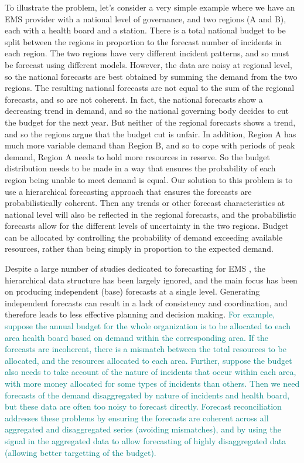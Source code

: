 \documentclass[
  authoryear,
  preprint,
  3p]{elsarticle}
\begin{document}
To illustrate the problem, let's consider a very simple example where we
have an EMS provider with a national level of governance, and two
regions (A and B), each with a health board and a station. There is a
total national budget to be split between the regions in proportion to
the forecast number of incidents in each region. The two regions have
very different incident patterns, and so must be forecast using
different models. However, the data are noisy at regional level, so the
national forecasts are best obtained by summing the demand from the two
regions. The resulting national forecasts are not equal to the sum of
the regional forecasts, and so are not coherent. In fact, the national
forecasts show a decreasing trend in demand, and so the national
governing body decides to cut the budget for the next year. But neither
of the regional forecasts shows a trend, and so the regions argue that
the budget cut is unfair. In addition, Region A has much more variable
demand than Region B, and so to cope with periods of peak demand, Region
A needs to hold more resources in reserve. So the budget distribution
needs to be made in a way that ensures the probability of each region
being unable to meet demand is equal. Our solution to this problem is to
use a hierarchical forecasting approach that ensures the forecasts are
probabilistically coherent. Then any trends or other forecast
characteristics at national level will also be reflected in the regional
forecasts, and the probabilistic forecasts allow for the different
levels of uncertainty in the two regions. Budget can be allocated by
controlling the probability of demand exceeding available resources,
rather than being simply in proportion to the expected demand.

Despite a large number of studies dedicated to forecasting for EMS
\citep{mingliterature2022, gul2020exhaustive, ibrahim2016modeling, wargon2009systematic},
the hierarchical data structure has been largely ignored, and the main
focus has been on producing independent (base) forecasts at a single
level. Generating independent forecasts can result in a lack of
consistency and coordination, and therefore leads to less effective
planning and decision making.
\textcolor{teal}{For example, suppose the annual budget for the whole organization is to be allocated to each area health board based on demand within the corresponding area. If the forecasts are incoherent, there is a mismatch between the total resources to be allocated, and the resources allocated to each area. Further, suppose the budget also needs to take account of the nature of incidents that occur within each area, with more money allocated for some types of incidents than others. Then we need forecasts of the demand disaggregated by nature of incidents and health board, but these data are often too noisy to forecast directly. Forecast reconciliation addresses these problems by ensuring the forecasts are coherent across all aggregated and disaggregated series (avoiding mismatches), and by using the signal in the aggregated data to allow forecasting of highly disaggregated data (allowing better targetting of the budget).}
\end{document}
